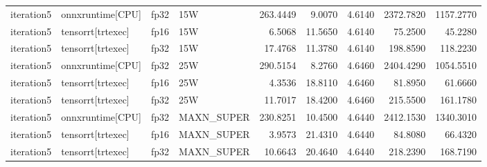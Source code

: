 \begin{table}
\begin{tabular}{llllrrrrr}
iteration5 & onnxruntime[CPU] & fp32 & 15W & 263.4449 & 9.0070 & 4.6140 & 2372.7820 & 1157.2770 \\
iteration5 & tensorrt[trtexec] & fp16 & 15W & 6.5068 & 11.5650 & 4.6140 & 75.2500 & 45.2280 \\
iteration5 & tensorrt[trtexec] & fp32 & 15W & 17.4768 & 11.3780 & 4.6140 & 198.8590 & 118.2230 \\
iteration5 & onnxruntime[CPU] & fp32 & 25W & 290.5154 & 8.2760 & 4.6460 & 2404.4290 & 1054.5510 \\
iteration5 & tensorrt[trtexec] & fp16 & 25W & 4.3536 & 18.8110 & 4.6460 & 81.8950 & 61.6660 \\
iteration5 & tensorrt[trtexec] & fp32 & 25W & 11.7017 & 18.4200 & 4.6460 & 215.5500 & 161.1780 \\
iteration5 & onnxruntime[CPU] & fp32 & MAXN\_SUPER & 230.8251 & 10.4500 & 4.6440 & 2412.1530 & 1340.3010 \\
iteration5 & tensorrt[trtexec] & fp16 & MAXN\_SUPER & 3.9573 & 21.4310 & 4.6440 & 84.8080 & 66.4320 \\
iteration5 & tensorrt[trtexec] & fp32 & MAXN\_SUPER & 10.6643 & 20.4640 & 4.6440 & 218.2390 & 168.7190 \\
\bottomrule
\end{tabular}
\end{table}
